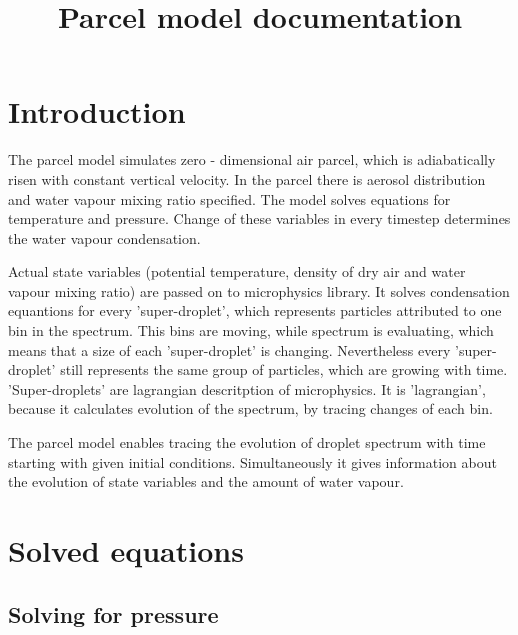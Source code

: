 \documentclass[11pt]{article}
\date{} %
\title{Parcel model documentation}
\begin{document}
\maketitle


\section{Introduction}\label{sec:intro}

The parcel model simulates zero - dimensional air parcel, which is adiabatically risen with constant vertical velocity. In the parcel there is aerosol distribution and water vapour mixing ratio specified. The model solves equations for temperature and pressure. Change of these variables in every timestep determines the water vapour condensation.

Actual state variables (potential temperature, density of dry air and water vapour mixing ratio) are passed on to microphysics library. It solves condensation equantions for every 'super-droplet', which represents particles attributed to one bin in the spectrum. This bins are moving, while spectrum is evaluating, which means that a size of each 'super-droplet' is changing. Nevertheless every 'super-droplet' still represents the same group of particles, which are growing with time. 'Super-droplets' are lagrangian descritption of microphysics. It is 'lagrangian', because it calculates evolution of the spectrum, by tracing changes of each bin.

The parcel model enables tracing the evolution of droplet spectrum with time starting with given initial conditions. Simultaneously it gives information about the evolution of state variables and the amount of water vapour.

\section{Solved equations}\label{sec:eqs}
\subsection{Solving for pressure}
\end{document}
